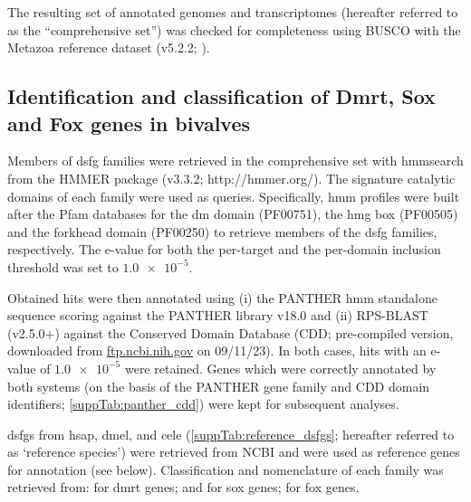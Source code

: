 The resulting set of annotated genomes and transcriptomes (hereafter referred to as the “comprehensive set”) was checked for completeness using BUSCO with the Metazoa reference dataset (v5.2.2; ).

\subsection{Identification and classification of Dmrt, Sox and Fox genes in bivalves}
Members of \gls{dsfg} families were retrieved in the comprehensive set with hmmsearch from the HMMER package (v3.3.2; http://hmmer.org/). The signature catalytic domains of each family were used as queries. Specifically, \gls{hmm} profiles were built after the Pfam databases for the \gls{dm} domain (PF00751), the \gls{hmg} box (PF00505) and the forkhead domain (PF00250) to retrieve members of the \gls{dsfg} families, respectively. The e-value for both the per-target and the per-domain inclusion threshold was set to $\num{1.0e-5}$.

Obtained hits were then annotated using (i) the PANTHER \gls{hmm} standalone sequence scoring against the PANTHER library v18.0 and (ii) RPS-BLAST (v2.5.0+) against the Conserved Domain Database (CDD; pre-compiled version, downloaded from \href{https://ftp.ncbi.nih.gov/pub/mmdb/cdd/little_endian/}{ftp.ncbi.nih.gov} on 09/11/23). In both cases, hits with an e-value of $\num{1.0e-5}$ were retained. Genes which were correctly annotated by both systems (on the basis of the PANTHER gene family and CDD domain identifiers; \cref{suppTab:panther_cdd}) were kept for subsequent analyses.

\glspl{dsfg} from \gls{hsap}, \gls{dmel}, and \gls{cele} (\cref{suppTab:reference_dsfgs}; hereafter referred to as ‘reference species’) were retrieved from NCBI and were used as reference genes for annotation (see below). Classification and nomenclature of each family was retrieved from:  for \gls{dmrt} genes;  and  for \gls{sox} genes;  for \gls{fox} genes.

